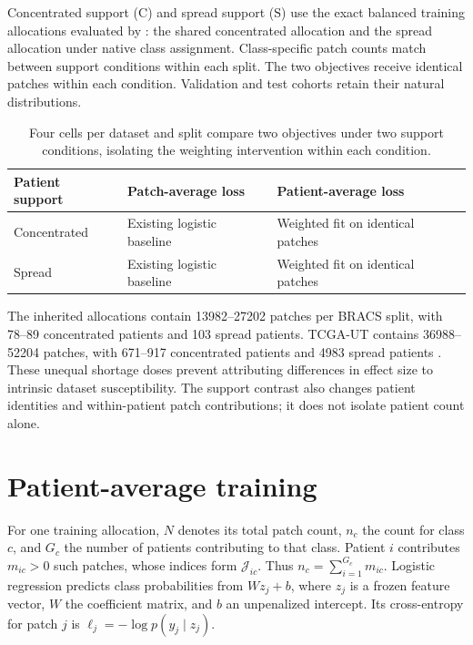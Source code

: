 \documentclass[11pt]{article}
\newcommand{\conc}{\mathrm{C}}
\newcommand{\spr}{\mathrm{S}}
\begin{document}
Concentrated support (\(\conc\)) and spread support (\(\spr\)) use the exact balanced training allocations evaluated by \citet{queisler2026patientShortage}: the shared concentrated allocation and the spread allocation under native class assignment. Class-specific patch counts match between support conditions within each split. The two objectives receive identical patches within each condition. Validation and test cohorts retain their natural distributions.

\begin{table}[htbp]
\centering
\renewcommand{\arraystretch}{1.15}
\begin{tabularx}{\textwidth}{@{}lXX@{}}
\toprule
Patient support & Patch-average loss & Patient-average loss \\
\midrule
Concentrated & Existing logistic baseline & Weighted fit on identical patches \\
Spread & Existing logistic baseline & Weighted fit on identical patches \\
\bottomrule
\end{tabularx}
\caption{Four cells per dataset and split compare two objectives under two support conditions, isolating the weighting intervention within each condition.}
\label{tab:design}
\end{table}

\noindent The inherited allocations contain \num{13982}--\num{27202} patches per BRACS split, with 78--89 concentrated patients and 103 spread patients. TCGA-UT contains \num{36988}--\num{52204} patches, with 671--917 concentrated patients and \num{4983} spread patients \citep{queisler2026patientShortage}. These unequal shortage doses prevent attributing differences in effect size to intrinsic dataset susceptibility. The support contrast also changes patient identities and within-patient patch contributions; it does not isolate patient count alone.

\section{Patient-average training}
\label{sec:objective}
For one training allocation, \(N\) denotes its total patch count, \(n_c\) the count for class \(c\), and \(G_c\) the number of patients contributing to that class. Patient \(i\) contributes \(m_{ic}>0\) such patches, whose indices form \(\mathcal J_{ic}\). Thus \(n_c=\sum_{i=1}^{G_c}m_{ic}\). Logistic regression predicts class probabilities from \(Wz_j+b\), where \(z_j\) is a frozen feature vector, \(W\) the coefficient matrix, and \(b\) an unpenalized intercept. Its cross-entropy for patch \(j\) is \(\ell_j=-\log p(y_j\mid z_j)\).
\end{document}
